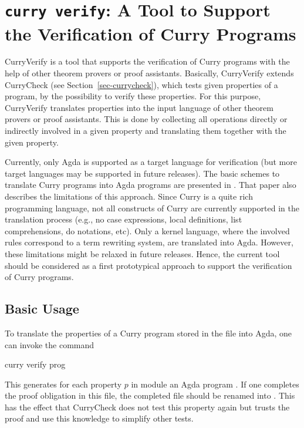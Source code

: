 \section{\texttt{curry verify}: A Tool to Support the Verification of Curry Programs}
\label{sec-curry2verify}

CurryVerify
is a tool that supports the verification of Curry programs
with the help of other theorem provers or proof assistants.
Basically, CurryVerify extends CurryCheck (see Section~\ref{sec-currycheck}),
which tests given properties of a program,
by the possibility to verify these properties.
For this purpose, CurryVerify translates properties
into the input language of other theorem provers or proof assistants.
This is done by collecting all operations directly or indirectly
involved in a given property and translating them together with
the given property.

Currently, only Agda \cite{Norell09} is supported as
a target language for verification (but more target languages
may be supported in future releases).
The basic schemes to translate Curry programs into Agda programs
are presented in \cite{AntoyHanusLibby17EPTCS}.
That paper also describes the limitations of this approach.
Since Curry is a quite rich programming language,
not all constructs of Curry are currently supported
in the translation process (e.g., no case expressions,
local definitions, list comprehensions, do notations, etc).
Only a kernel language, where the involved rules
correspond to a term rewriting system, are translated into Agda.
However, these limitations might be relaxed in future releases.
Hence, the current tool should be considered as a first prototypical
approach to support the verification of Curry programs.

\subsection{Basic Usage}

To translate the properties of a Curry program stored
in the file  into Agda,
one can invoke the command
%
\begin{curry}
curry verify prog
\end{curry}
%
This generates for each property $p$ in module 
an Agda program .
If one completes the proof obligation in this file,
the completed file should be renamed into
.
This has the effect that CurryCheck does not test this property again
but trusts the proof and use this knowledge to simplify other tests.

